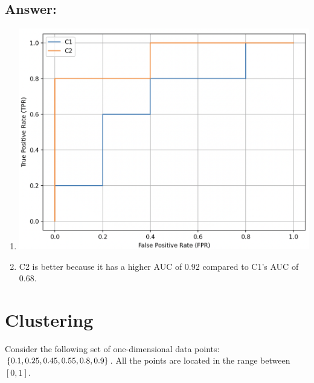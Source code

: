 \documentclass{article}
\begin{document}
\subsection*{Answer:}
\begin{enumerate} [label= (\alph*)]
    \item 
    \includegraphics[scale=.4]{./images/ROC1.png}
    \item C2 is better because it has a higher AUC of 0.92 compared to C1's AUC of 0.68.
\end{enumerate}

\section{Clustering}

Consider the following set of one-dimensional data points:
$\{0.1,0.25,0.45,0.55,\\0.8,0.9\}$.
All the points are located in the range between $[0,1]$.
\end{document}
